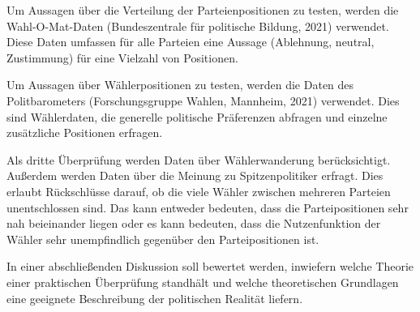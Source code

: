 Um Aussagen über die Verteilung der Parteienpositionen zu testen, werden die Wahl-O-Mat-Daten (Bundeszentrale für politische Bildung, 2021) verwendet. Diese Daten umfassen für alle Parteien eine Aussage (Ablehnung, neutral, Zustimmung) für eine Vielzahl von Positionen.

Um Aussagen über Wählerpositionen zu testen, werden die Daten des Politbarometers (Forschungsgruppe Wahlen, Mannheim, 2021) verwendet. Dies sind Wählerdaten, die generelle politische Präferenzen abfragen und einzelne zusätzliche Positionen erfragen.

Als dritte Überprüfung werden Daten über Wählerwanderung berücksichtigt. Außerdem werden Daten über die Meinung zu Spitzenpolitiker erfragt. Dies erlaubt Rückschlüsse darauf, ob die viele Wähler zwischen mehreren Parteien unentschlossen sind. Das kann entweder bedeuten, dass die Parteipositionen sehr nah beieinander liegen oder es kann bedeuten, dass die Nutzenfunktion der Wähler sehr unempfindlich gegenüber den Parteipositionen ist.

In einer abschließenden Diskussion soll bewertet werden, inwiefern welche Theorie einer praktischen Überprüfung standhält und welche theoretischen Grundlagen eine geeignete Beschreibung der politischen Realität liefern.
